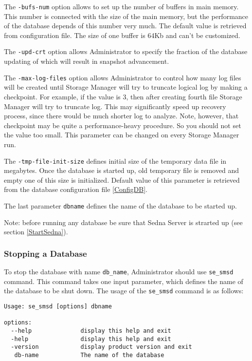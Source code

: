 \documentclass[a4paper,12pt]{article}
\begin{document}
The \verb!-bufs-num! option allows to set up the number of buffers in main
memory. This number is connected with the size of the main memory, but the
performance of the database depends of this number very much. The default value
is retrieved from configuration file. The size of one buffer is 64Kb and can't
be customized.

The \verb!-upd-crt! option allows Administrator to specify the fraction of the
database updating of which will result in snapshot advancement.

The \verb!-max-log-files! option allows Administrator to control how many log
files will be created until Storage Manager will try to truncate logical log by
making a checkpoint. For example, if the value is 3, then after creating
fourth file Storage Manager will try to truncate log. This may significantly
speed up recovery process, since there would be much shorter log to analyze.
Note, however, that checkpoint may be quite a performance-heavy procedure. So
you should not set the value too small. This parameter can be changed on every
Storage Manager run.

The \verb!-tmp-file-init-size! defines initial size of the temporary data file
in megabytes. Once the database is started up, old temporary file is removed and
empty one of this size is initialized. Default value of this parameter is
retrieved from the database configuration file \ref{ConfigDB}.

The last parameter \verb!dbname! defines the name of the database to be started
up.

Note: before running any database be sure that Sedna Server is strarted up (see
section \ref{StartSedna}).


\subsubsection{Stopping a Database}
\label{StopDB}

To stop the database with name \verb!db_name!, Administrator should use
\verb!se_smsd! command. This command takes one input parameter, which defines
the name of the database to be shut down. The usage of the \verb!se_smsd!
command is as follows:

\small{
\begin{verbatim}
Usage: se_smsd [options] dbname

options:
  --help              display this help and exit
  -help               display this help and exit
  -version            display product version and exit
   db-name            The name of the database
\end{verbatim}}
\end{document}
